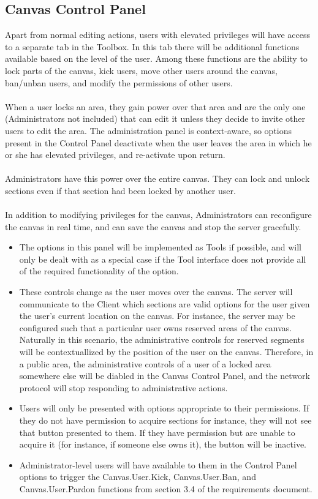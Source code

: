 \documentclass[11pt,oneside,a4paper]{article}
\begin{document}
 \subsection{Canvas Control Panel}
  Apart from normal editing actions, users with elevated privileges will have
  access to a separate tab in the Toolbox. In this tab there will be additional
  functions available based on the level of the user. Among these functions are
  the ability to lock parts of the canvas, kick users, move other users around
  the canvas, ban/unban users, and modify the permissions of other users.\\\\
  When a user locks an area, they gain power over that area and are the only one
  (Administrators not included) that can edit it unless they decide to invite
  other users to edit the area. The administration panel is context-aware, so
  options present in the Control Panel deactivate when the user leaves the area
  in which he or she has elevated privileges, and re-activate upon return.\\\\
  Administrators have this power over the entire canvas. They can lock and
  unlock sections even if that section had been locked by another user.\\\\
  In addition to modifying privileges for the canvas, Administrators can
  reconfigure the canvas in real time, and can save the canvas and stop the
  server gracefully.
  \begin{itemize}
   \item
    The options in this panel will be implemented as Tools if possible, and
    will only be dealt with as a special case if the Tool interface does not
    provide all of the required functionality of the option.
   \item
    These controls change as the user moves over the canvas. The server will
    communicate to the Client which sections are valid options for the user given
    the user's current location on the canvas. For instance, the server may be
    configured such that a particular user owns reserved areas of the canvas.
    Naturally in this scenario, the administrative controls for reserved segments
    will be contextuallized by the position of the user on the canvas. Therefore,
    in a public area, the administrative controls of a user of a locked area
    somewhere else will be diabled in the Canvas Control Panel, and the network
    protocol will stop responding to administrative actions.
   \item
    Users will only be presented with options appropriate to their
    permissions. If they do not have permission to acquire sections for
    instance, they will not see that button presented to them. If they have
    permission but are unable to acquire it (for instance, if someone else
    owns it), the button will be inactive.
   \item
    Administrator-level users will have available to them in the Control Panel
    options to trigger the Canvas.User.Kick, Canvas.User.Ban, and
    Canvas.User.Pardon functions from section 3.4 of the requirements document.
  \end{itemize}
\end{document}
